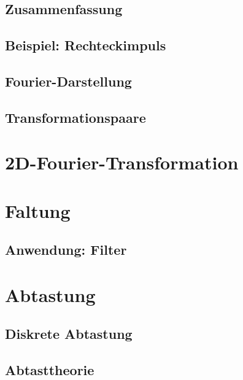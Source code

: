 \documentclass[a4paper, 11pt, accentcolor = tud3b]{tudreport}
\begin{document}
			\subsection{Zusammenfassung} %

			\subsection{Beispiel: Rechteckimpuls} %

			\subsection{Fourier-Darstellung} %

			\subsection{Transformationspaare} %

		\section{2D-Fourier-Transformation} %

		\section{Faltung} %

			\subsection{Anwendung: Filter} %

		\section{Abtastung} %

			\subsection{Diskrete Abtastung} %

			\subsection{Abtasttheorie} %
\end{document}
